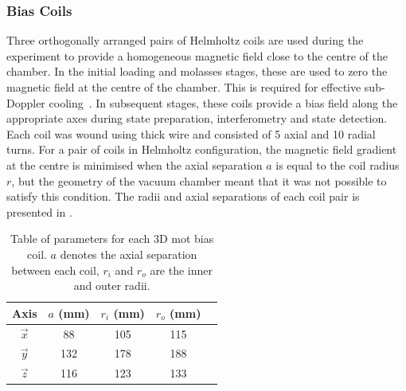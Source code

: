 \subsubsection{Bias Coils}
Three orthogonally arranged pairs of Helmholtz coils are used during the
experiment to provide a homogeneous magnetic field close to the centre of the chamber. In the initial loading and molasses stages, these are used to zero the magnetic field at the centre of the chamber. This is
required for effective sub-Doppler cooling~\nocite{Walhout1992}. In subsequent stages,
these coils provide a bias field along the appropriate axes during state
preparation, interferometry and state detection. Each coil was wound using
 thick wire and consisted of 5 axial and 10 radial
turns. For a pair of coils in Helmholtz configuration, the magnetic field
gradient at the centre is minimised when the axial separation \(a\) is equal to
the coil radius \(r\), but the geometry of the vacuum chamber meant that it was
not possible to satisfy this condition. The radii and axial separations of each
coil pair is presented in .\begin{table}
	\begin{tabular}{|c|c|c|c|c|}
		\hline
		Axis        & \(a\) (mm) & \(r_i\) (mm) & \(r_o\) (mm) \\
		\hline
		\(\vec{x}\) & 88         & 105          & 115          \\
		\(\vec{y}\) & 132        & 178          & 188          \\
		\(\vec{z}\) & 116        & 123          & 133          \\
		\hline
	\end{tabular}
	\caption[Table of parameters for each 3D \ac{mot} bias coil.]{Table of
		parameters for each 3D \ac{mot }bias coil. \(a\) denotes the axial
		separation between each coil, \(r_i\) and \(r_o\) are the inner and
		outer radii.}
	\label{tab:bias_coils}
\end{table}
